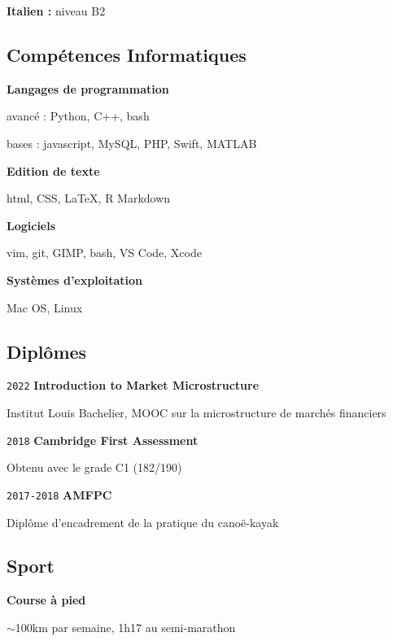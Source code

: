 \documentclass{article}
\begin{document}
\begin{multicols}{2}
\begin{itemize}
			\textbf{Italien :} niveau B2
		\end{itemize}

	{\color{blue} \subsection*{Compétences Informatiques}}

		\noindent\textbf{Langages de programmation}

		avancé : Python, C++, bash
				
		bases : javascript, MySQL, PHP, Swift, MATLAB

\hfill

		\noindent\textbf{Edition de texte}

		html, CSS, LaTeX, R Markdown

\hfill

		\noindent\textbf{Logiciels}

		vim, git, GIMP, bash, VS Code, Xcode

\hfill

		\noindent\textbf{Systèmes d'exploitation}

		Mac OS, Linux

\hfill

{\color{blue} \subsection*{Diplômes}}

		\noindent\texttt{2022} \textbf{Introduction to Market Microstructure}

		Institut Louis Bachelier, MOOC sur la microstructure de marchés financiers

\hfill

		\noindent\texttt{2018} \textbf{Cambridge First Assessment}

		Obtenu avec le grade C1 (182/190)

\hfill

		\noindent\texttt{2017-2018} \textbf{AMFPC}

		Diplôme d'encadrement de la pratique du canoë-kayak

\hfill

{\color{blue} \subsection*{Sport}\label{sport}}

		\noindent\textbf{Course à pied}

		$\sim$100km par semaine, 1h17 au semi-marathon


\end{multicols}
\end{document}

